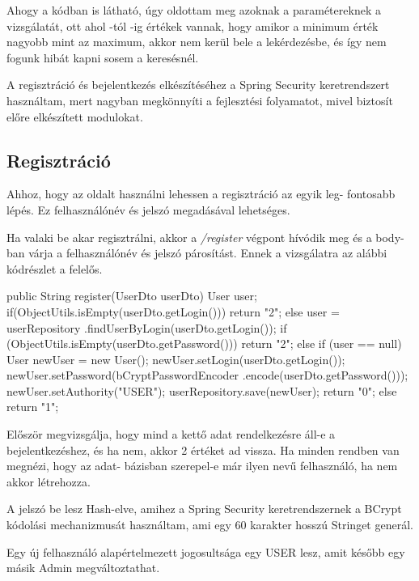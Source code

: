 Ahogy a kódban is látható, úgy oldottam meg azoknak a paramétereknek a vizsgálatát, ott ahol -tól -ig értékek vannak, hogy amikor a minimum érték nagyobb mint az maximum, akkor nem kerül bele a lekérdezésbe, és így nem fogunk hibát kapni sosem a keresésnél.

A regisztráció és bejelentkezés elkészítéséhez a Spring Security keretrendszert \cite{SpringSecurity} használtam, mert nagyban megkönnyíti a fejlesztési folyamatot, mivel biztosít előre elkészített modulokat.

\subsection{Regisztráció}
Ahhoz, hogy az oldalt használni lehessen  a regisztráció az egyik leg-
fontosabb lépés. Ez felhasználónév és  jelszó megadásával lehetséges. 

Ha valaki be akar regisztrálni, akkor a  \textit{/register} végpont hívódik meg és a body-ban várja a felhasználónév és jelszó párosítást. Ennek a vizsgálatra az alábbi kódrészlet a felelős.

\begin{java}
 public String register(UserDto userDto) {
     User user;
     if(ObjectUtils.isEmpty(userDto.getLogin())) {
       return "2";
     } else {
         user = userRepository
           .findUserByLogin(userDto.getLogin());
     }
     if (ObjectUtils.isEmpty(userDto.getPassword())) {
       return "2";
       } else {
          if (user == null) {
             User newUser = new User();
             newUser.setLogin(userDto.getLogin());
             newUser.setPassword(bCryptPasswordEncoder
                        .encode(userDto.getPassword()));
             newUser.setAuthority("USER");
             userRepository.save(newUser);
             return "0";
          } else {
             return "1";
          }
        }
    }
\end{java}

Először megvizsgálja, hogy mind a kettő adat rendelkezésre áll-e a bejelentkezéshez, és ha nem, akkor 2 értéket ad vissza. Ha minden rendben van megnézi, hogy az adat-
bázisban szerepel-e már ilyen nevű felhasználó, ha nem akkor létrehozza.


A jelszó be lesz Hash-elve, amihez a Spring Security  keretrendszernek a BCrypt kódolási mechanizmusát használtam, ami egy 60 karakter hosszú Stringet generál.

Egy új felhasználó alapértelmezett jogosultsága egy USER lesz, amit később egy másik Admin megváltoztathat.

